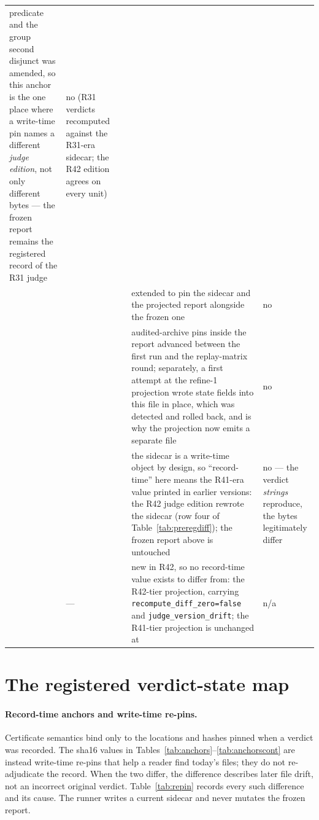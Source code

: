 \documentclass{article}
\begin{document}
{\begin{longtable}{@{}Q{58pt} Q{68pt} Q{68pt} Q{110pt} Q{68pt}@{}}
    predicate and the group second disjunct was amended, so this anchor is the one place
    where a write-time pin names a different \emph{judge edition}, not only different bytes
    --- the frozen report remains the registered record of the R31 judge & no (R31
    verdicts recomputed against the R31-era sidecar; the R42 edition agrees on every unit)
    \\
\addlinespace[2pt]
 &  & 
  & extended to pin the sidecar and the projected report alongside the frozen one & no \\
\addlinespace[2pt]
 &  & 
  & audited-archive pins inside the report advanced between the first run and the
    replay-matrix round; separately, a first attempt at the refine-1 projection wrote
    state fields into this file in place, which was detected and rolled back, and is why
    the projection now emits a separate file & no \\
\addlinespace[2pt]
 &  &
  & the sidecar is a write-time object by design, so ``record-time'' here means the
    R41-era value printed in earlier versions: the R42 judge edition rewrote the sidecar
    (row four of Table~\ref{tab:preregdiff}); the frozen report above is untouched &
    no --- the verdict \emph{strings} reproduce, the bytes legitimately differ \\
\addlinespace[2pt]
 & --- & 
  & new in R42, so no record-time value exists to differ from: the R42-tier projection,
    carrying \texttt{recompute\_diff\_zero=false} and \texttt{judge\_version\_drift}; the
    R41-tier projection is unchanged at  & n/a \\
\end{longtable}
}

\section{The registered verdict-state map}
\label{app:statemap}

\paragraph{Record-time anchors and write-time re-pins.}
Certificate semantics bind only to the locations and hashes pinned when a verdict was
recorded. The sha16 values in Tables~\ref{tab:anchors}--\ref{tab:anchorscont} are instead
write-time re-pins that help a reader find today's files; they do not re-adjudicate the
record. When the two differ, the difference describes later file drift, not an incorrect
original verdict. Table~\ref{tab:repin} records every such difference and its cause. The
runner writes a current sidecar and never mutates the frozen report.
\end{document}
